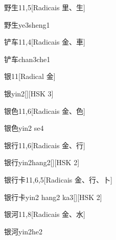 \begin{entry}{野生}{11,5}[Radicais ⾥、⽣]
  \begin{phonetics}{野生}{ye3sheng1}
  \end{phonetics}
\end{entry}

\begin{entry}{铲车}{11,4}[Radicais ⾦、⾞]
  \begin{phonetics}{铲车}{chan3che1}
  \end{phonetics}
\end{entry}

\begin{entry}{银}{11}[Radical ⾦]
  \begin{phonetics}{银}{yin2}[][HSK 3]
  \end{phonetics}
\end{entry}

\begin{entry}{银色}{11,6}[Radicais ⾦、⾊]
  \begin{phonetics}{银色}{yin2 se4}
  \end{phonetics}
\end{entry}

\begin{entry}{银行}{11,6}[Radicais ⾦、⾏]
  \begin{phonetics}{银行}{yin2hang2}[][HSK 2]
  \end{phonetics}
\end{entry}

\begin{entry}{银行卡}{11,6,5}[Radicais ⾦、⾏、⼘]
  \begin{phonetics}{银行卡}{yin2 hang2 ka3}[][HSK 2]
  \end{phonetics}
\end{entry}

\begin{entry}{银河}{11,8}[Radicais ⾦、⽔]
  \begin{phonetics}{银河}{yin2he2}
  \end{phonetics}
\end{entry}

